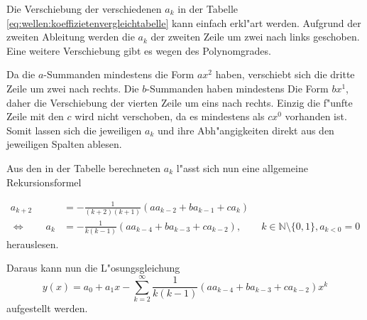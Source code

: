 Die Verschiebung der verschiedenen $a_k$ in der Tabelle 
\ref{eq:wellen:koeffizietenvergleichtabelle} kann einfach erkl"art werden. 
Aufgrund der zweiten Ableitung werden die $a_k$ der zweiten Zeile um zwei nach 
links geschoben. Eine weitere Verschiebung gibt es wegen des Polynomgrades.

Da die $a$-Summanden mindestens die Form $ax^2$ haben, verschiebt sich die 
dritte Zeile um zwei nach rechts. Die $b$-Summanden haben mindestens Die Form 
$bx^1$, daher die Verschiebung der vierten Zeile um eins nach rechts. Einzig 
die f"unfte Zeile mit den $c$ wird nicht verschoben, da es mindestens als 
$cx^0$ vorhanden ist. Somit lassen sich die jeweiligen $a_k$ und ihre 
Abh"angigkeiten direkt aus den jeweiligen Spalten ablesen.

Aus den in der Tabelle berechneten $a_k$ l"asst sich nun eine allgemeine 
Rekursionsformel

\begin{equation*}
	\begin{split}
		a_{k+2} &= -\frac{1}{(k+2)(k+1)} (aa_{k-2}+ba_{k-1}+ca_k) \\
		\Leftrightarrow \qquad
		a_k &= -\frac{1}{k(k-1)} (aa_{k-4}+ba_{k-3}+ca_{k-2}), \qquad k \in 
		\mathbb{N} \setminus \{0, 1\}, a_{k<0} = 0
	\end{split}
\end{equation*}
herauslesen. 

Daraus kann nun die L"osungsgleichung
\begin{equation}
	y(x) = a_0 + a_1x 
	-\sum_{k=2}^{\infty}\frac{1}{k(k-1)}(aa_{k-4}+ba_{k-3}+ca_{k-2})x^k
	\label{eq:wellen:ygleichung}
\end{equation}
aufgestellt werden.
